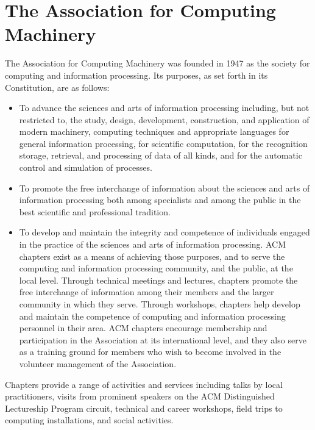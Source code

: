 \section{The Association for Computing Machinery}
\label{sec:sec02}

The Association for Computing Machinery was founded in 1947 as the society for
computing and information processing. Its purposes, as set forth in its
Constitution, are as follows:
  \begin{itemize}
    \item To advance the sciences and arts of information processing including,
          but not restricted to, the study, design, development, construction,
          and application of modern machinery, computing techniques and
          appropriate languages for general information processing, for
          scientific computation, for the recognition storage, retrieval, and
          processing of data of all kinds, and for the automatic control and
          simulation of processes.
    \item To promote the free interchange of information about the sciences and
          arts of information processing both among specialists and among the
          public in the best scientific and professional tradition.
    \item To develop and maintain the integrity and competence of individuals
          engaged in the practice of the sciences and arts of information
          processing. ACM chapters exist as a means of achieving those purposes,
          and to serve the computing and information processing community, and
          the public, at the local level. Through technical meetings and lectures,
          chapters promote the free interchange of information among their members
          and the larger community in which they serve. Through workshops, chapters
          help develop and maintain the competence of computing and information
          processing personnel in their area. ACM chapters encourage membership
          and participation in the Association at its international level, and
          they also serve as a training ground for members who wish to become
          involved in the volunteer management of the Association.
  \end{itemize}

Chapters provide a range of activities and services including talks by local
practitioners, visits from prominent speakers on the ACM Distinguished
Lectureship Program circuit, technical and career workshops, field trips to
computing installations, and social activities.

